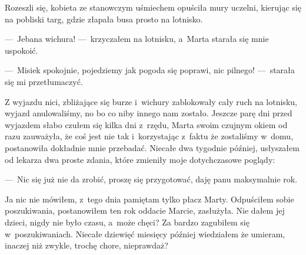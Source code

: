Rozeszli się, kobieta ze stanowczym uśmiechem opuściła mury uczelni, kierując się na pobliski targ, gdzie złapała busa prosto na lotnisko.

\paraSep

---~Jebana wichura! ---~krzyczałem na lotnisku, a~Marta starała się mnie uspokoić.

---~Misiek spokojnie, pojedziemy jak pogoda się poprawi, nic pilnego! ---~starała się mi przetłumaczyć.

Z wyjazdu nici, zbliżające się burze i~wichury zablokowały cały ruch na lotnisku, wyjazd anulowaliśmy, no bo co niby innego nam zostało. Jeszcze parę dni przed wyjazdem słabo czułem się kilka dni z~rzędu, Marta swoim czujnym okiem od razu zauważyła, że coś jest nie tak i~korzystając z~faktu że zostaliśmy w~domu, postanowiła dokładnie mnie przebadać. Niecałe dwa tygodnie później, usłyszałem od lekarza dwa proste zdania, które zmieniły moje dotychczasowe poglądy:

---~Nic się już nie da zrobić, proszę się przygotować, daję panu maksymalnie rok.

Ja nic nie mówiłem, z~tego dnia pamiętam tylko płacz Marty. Odpuściłem sobie poszukiwania, postanowiłem ten rok oddacie Marcie, zasłużyła. Nie dałem jej dzieci, nigdy nie było czasu, a~może chęci? Za bardzo zagubiłem się w~poszukiwaniach. Niecałe dziewięć miesięcy później wiedziałem że umieram, inaczej niż zwykle, trochę chore, nieprawdaż?
